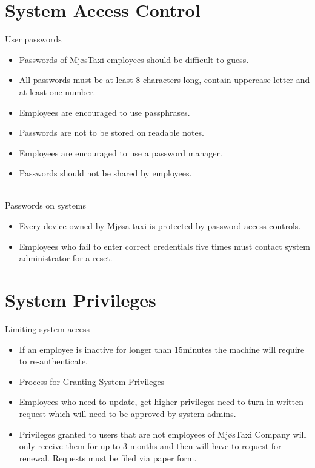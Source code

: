 \section{System Access Control}
User passwords 
    \begin{itemize}[noitemsep]  %
        \item Passwords of MjøsTaxi employees should be difficult to guess.
        \item All passwords must be at least 8 characters long, contain uppercase letter and at least one number.
        \item Employees are encouraged to use passphrases.
        \item Passwords are not to be stored on readable notes.
        \item Employees are encouraged to use a password manager.
        \item Passwords should not be shared by employees.
    \end{itemize}{} 
\\
Passwords on systems
    \begin{itemize}[noitemsep]
        \item Every device owned by Mjøsa taxi is protected by password access controls.
        \item Employees who fail to enter correct credentials five times must contact system administrator for a reset.
    \end{itemize}{}
    
\section{System Privileges}
Limiting system access
    \begin{itemize}[noitemsep]
        \item If an employee is inactive for longer than 15minutes the machine will require to re-authenticate.
        \item Process for Granting System Privileges
        \item Employees who need to update, get higher privileges need to turn in written request which will need to be approved by system admins.
        \item Privileges granted to users that are not employees of MjøsTaxi Company will only receive them for up to 3 months and then will have to request for renewal. Requests must be filed via paper form.
    \end{itemize}

